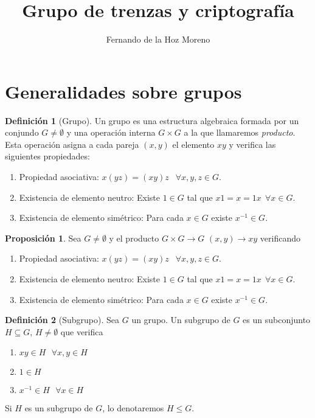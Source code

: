 \documentclass[12pt]{article}
\title{Grupo de trenzas y criptografía}
\author{Fernando de la Hoz Moreno}
\date{}
\theoremstyle{definition}
\newtheorem{defi}{Definición}[section]
\newtheorem{prop}{Proposición}[section]
\begin{document}
\maketitle

\section{Generalidades sobre grupos}

\begin{defi}[Grupo]
Un grupo es una estructura algebraica formada por un conjundo $G\neq\emptyset$ y una operación interna $G\times G$ a la que llamaremos \textit{producto}. Esta operación asigna a cada pareja $(x,y)$ el elemento $xy$ y verifica las siguientes propiedades:

\begin{enumerate}
\item Propiedad asociativa: $x(yz) = (xy)z$ $\ \ \forall x,y,z\in G$.
\item Existencia de elemento neutro: Existe $1\in G$ tal que $x1= x = 1x\ \ \forall x\in G$.
\item Existencia de elemento simétrico: Para cada $x \in G$ existe $x^{-1}\in G$.
\end{enumerate}
\end{defi}

\begin{prop}
Sea $G\neq\emptyset$ y el producto $G\times G\rightarrow G$ $(x,y)\rightarrow xy$ verificando

\begin{enumerate}
\item Propiedad asociativa: $x(yz) = (xy)z$ $\ \ \forall x,y,z\in G$.
\item Existencia de elemento neutro: Existe $1\in G$ tal que $x1= x = 1x\ \ \forall x\in G$.
\item Existencia de elemento simétrico: Para cada $x \in G$ existe $x^{-1}\in G$.
\end{enumerate}

\end{prop}

\begin{defi}[Subgrupo]
Sea $G$ un grupo. Un subgrupo de $G$ es un subconjunto $H\subseteq G$, $H\neq\emptyset$ que verifica
\begin{enumerate}
\item $xy\in H\ \ \ \forall x,y\in H$ 
\item $1\in H$
\item $x^{-1}\in H\ \ \ \forall x\in H$
\end{enumerate}

Si $H$ es un subgrupo de $G$, lo denotaremos $H\leq G$.

\end{defi}
\end{document}
